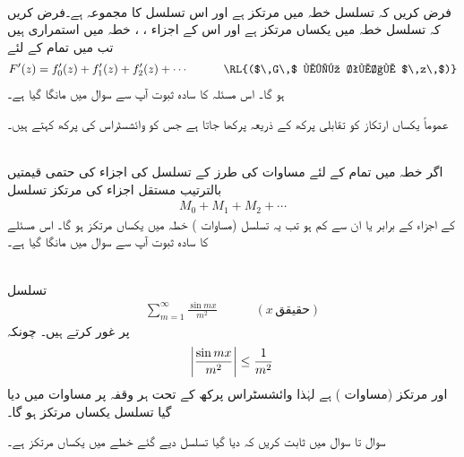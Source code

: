 \quad {}\\
فرض کریں کہ تسلسل  خطہ  میں مرتکز ہے اور اس تسلسل کا مجموعہ  ہے۔فرض کریں کہ تسلسل
  خطہ  میں یکساں مرتکز ہے اور اس کے اجزاء ، ،  خطہ  میں استمراری ہیں تب  میں تمام  کے لئے 
\begin{align*}
F'(z)=f'_0(z)+f'_1(z)+f'_2(z)+\cdots\quad \quad \quad \text{\RL{($\,G\,$ میں تمام $\,z\,$)}}
\end{align*}
ہو گا۔
اس مسئلہ کا سادہ ثبوت آپ سے سوال  میں مانگا گیا ہے۔

عموماً یکساں ارتکاز کو تقابلی پرکھ کے ذریعہ  پرکھا جاتا ہے جس کو وائشسٹراس کی پرکھ  کہتے ہیں۔

\quad {}\\
اگر خطہ  میں تمام  کے لئے مساوات  کی طرز کے تسلسل کی اجزاء کی حتمی قیمتیں بالترتیب مستقل اجزاء کی مرتکز تسلسل
\begin{align}
M_0+M_1+M_2+\cdots
\end{align} 
کے اجزاء کے برابر  یا ان سے کم ہو تب یہ تسلسل (مساوات ) خطہ میں یکساں مرتکز ہو گا۔ 
اس مسئلے کا سادہ ثبوت آپ سے سوال  میں مانگا گیا ہے۔

\quad {}\\
تسلسل
\begin{align}\label{مساوات_ٹیلر_وائشسٹراس_ایم}
\sum\limits_{m=1}^{\infty} \frac{\sin mx}{m^2}\quad \quad \quad (x\,\text{حقیقق})
\end{align}
پر غور کرتے ہیں۔ چونکہ
\begin{align*}
\abs{\frac{\sin mx}{m^2}}\le \frac{1}{m^2}
\end{align*}
 اور  مرتکز (مساوات ) ہے  لہٰذا  وائشسٹراس پرکھ  کے تحت  ہر وقفہ پر مساوات  میں دیا گیا تسلسل یکساں مرتکز  ہو گا۔

سوال  تا سوال  میں ثابت کریں کہ دیا گیا تسلسل دیے گئے خطے میں یکساں مرتکز ہے۔

